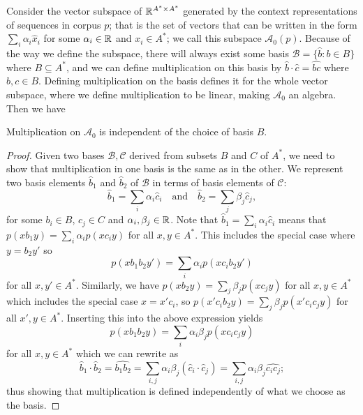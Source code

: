 \documentclass[12pt]{report}
\begin{document}
Consider the vector subspace of $\mathbb{R}^{A^* \times A^*}$ generated by the context representations of sequences in corpus $p$; that is the set of vectors that can be written in the form $\sum_i \alpha_i \hat{x}_i$ for some $\alpha_i \in \mathbb{R}$  and $x_i \in A^*$; we call this subspace $\mathcal{A}_0(p)$. Because of the way we define the subspace, there will always exist some basis $\mathcal{B} = \{\hat{b} : b \in B\}$ where $B \subseteq A^*$, and we can define multiplication on this basis by $\hat{b}\cdot\hat{c} = \widehat{bc}$ where $b,c \in B$. Defining multiplication on the basis defines it for the whole vector subspace, where we define multiplication to be linear, making $\mathcal{A}_0$ an algebra.
Then we have
\begin{prop}
Multiplication on $\mathcal{A}_0$ is independent of the choice of basis $B$.
\end{prop}
\begin{proof}
Given two bases $\mathcal{B , C}$ derived from subsets $B$ and $C$ of $A^*$, we need to show that multiplication in one basis is the same as in the other. We represent two basis elements $\hat{b}_1$ and $\hat{b}_2$ of $\mathcal{B}$ in terms of basis elements of $\mathcal{C}$:
$$\hat{b}_1 = \sum_i \alpha_i \hat{c}_i \quad\text{and}\quad
\hat{b}_2 = \sum_j \beta_j \hat{c}_j,$$
for some $b_i \in B$, $c_j \in C$ and $\alpha_i, \beta_j  \in \mathbb{R}$.
Note that $\hat{b}_1 = \sum_i \alpha_i \hat{c}_i$ means that $p(xb_1y) = \sum_i \alpha_i p(xc_iy)$ for all $x,y \in A^*$. This includes the special case where $y = b_2y'$ so $$p(xb_1b_2y') = \sum_i \alpha_i p(xc_ib_2y')$$ for all $x, y' \in A^*$.
Similarly, we have $p(xb_2y) = \sum_j \beta_j p(xc_jy)$ for all $x,y \in A^*$ which includes the special case $x = x'c_i$, so $p(x'c_ib_2y) = \sum_j \beta_j p(x'c_ic_jy)$ for all $x',y \in A^*$. Inserting this into the above expression yields
$$p(xb_1b_2y) = \sum_i \alpha_i\beta_j p(xc_ic_jy)$$
for all $x,y \in A^*$ which we can rewrite as
$$\hat{b}_1\cdot\hat{b}_2 = \widehat{b_1b_2} = \sum_{i,j}\alpha_i\beta_j (\hat{c}_i\cdot\hat{c}_j)
= \sum_{i,j}\alpha_i\beta_j \widehat{c_ic_j};$$
thus showing that multiplication is defined independently of what we choose as the basis.
\end{proof}
\end{document}
